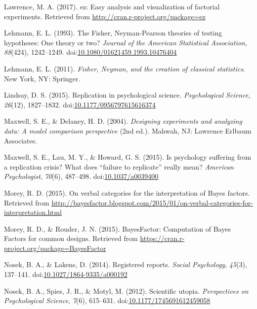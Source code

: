 \documentclass[english,man]{apa6}
\theoremstyle{definition}
\theoremstyle{definition}
\theoremstyle{definition}
\theoremstyle{remark}
\begin{document}
\hypertarget{ref-Lawrence2017}{}
Lawrence, M. A. (2017). ez: Easy analysis and visualization of factorial
experiments. Retrieved from \url{http://cran.r-project.org/package=ez}

\hypertarget{ref-Lehmann1993}{}
Lehmann, E. L. (1993). The Fisher, Neyman-Pearson theories of testing
hypotheses: One theory or two? \emph{Journal of the American Statistical
Association}, \emph{88}(424), 1242--1249.
doi:\href{https://doi.org/10.1080/01621459.1993.10476404}{10.1080/01621459.1993.10476404}

\hypertarget{ref-Lehmann2011}{}
Lehmann, E. L. (2011). \emph{Fisher, Neyman, and the creation of
classical statistics}. New York, NY: Springer.

\hypertarget{ref-Lindsay2015}{}
Lindsay, D. S. (2015). Replication in psychological science.
\emph{Psychological Science}, \emph{26}(12), 1827--1832.
doi:\href{https://doi.org/10.1177/0956797615616374}{10.1177/0956797615616374}

\hypertarget{ref-Maxwell2004}{}
Maxwell, S. E., \& Delaney, H. D. (2004). \emph{Designing experiments
and analyzing data: A model comparison perspective} (2nd ed.). Mahwah,
NJ: Lawrence Erlbaum Associates.

\hypertarget{ref-Maxwell2015}{}
Maxwell, S. E., Lau, M. Y., \& Howard, G. S. (2015). Is psychology
suffering from a replication crisis? What does ``failure to replicate''
really mean? \emph{American Psychologist}, \emph{70}(6), 487--498.
doi:\href{https://doi.org/10.1037/a0039400}{10.1037/a0039400}

\hypertarget{ref-Morey2015c}{}
Morey, R. D. (2015). On verbal categories for the interpretation of
Bayes factors. Retrieved from
\url{http://bayesfactor.blogspot.com/2015/01/on-verbal-categories-for-interpretation.html}

\hypertarget{ref-Morey2015b}{}
Morey, R. D., \& Rouder, J. N. (2015). BayesFactor: Computation of Bayes
Factors for common designs. Retrieved from
\url{https://cran.r-project.org/package=BayesFactor}

\hypertarget{ref-Nosek2014}{}
Nosek, B. A., \& Lakens, D. (2014). Registered reports. \emph{Social
Psychology}, \emph{45}(3), 137--141.
doi:\href{https://doi.org/10.1027/1864-9335/a000192}{10.1027/1864-9335/a000192}

\hypertarget{ref-Nosek2012}{}
Nosek, B. A., Spies, J. R., \& Motyl, M. (2012). Scientific utopia.
\emph{Perspectives on Psychological Science}, \emph{7}(6), 615--631.
doi:\href{https://doi.org/10.1177/1745691612459058}{10.1177/1745691612459058}
\end{document}
